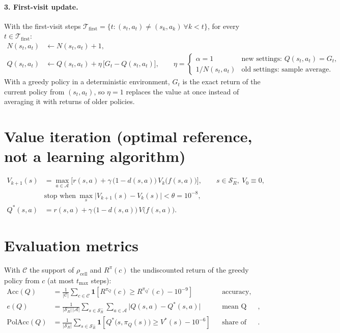 \documentclass[11pt]{article}
\newcommand{\Sset}{\mathcal{S}}
\newcommand{\Aset}{\mathcal{A}}
\newcommand{\ind}[1]{\mathbf{1}\!\left[#1\right]}
\newcommand{\Qs}{Q^{*}}
\begin{document}
\paragraph{3. First-visit update.} With the first-visit steps
$\mathcal{T}_{\mathrm{first}}=\{t:(s_t,a_t)\neq(s_k,a_k)\ \forall k<t\}$, for every $t\in\mathcal{T}_{\mathrm{first}}$:
\begin{align}
N(s_t,a_t) &\leftarrow N(s_t,a_t)+1,\\
Q(s_t,a_t) &\leftarrow Q(s_t,a_t)+\eta\,\big[G_t-Q(s_t,a_t)\big],\qquad
\eta=\begin{cases}\alpha=1 & \text{new settings: } Q(s_t,a_t)=G_t,\\ 1/N(s_t,a_t) & \text{old settings: sample average}.\end{cases}
\end{align}
With a greedy policy in a deterministic environment, $G_t$ is the exact return of the current policy from $(s_t,a_t)$, so $\eta=1$ replaces the value at once instead of averaging it with returns of older policies.

\section{Value iteration (optimal reference, not a learning algorithm)}
\begin{align}
V_{k+1}(s) &= \max_{a\in\Aset}\Big[r(s,a)+\gamma\,\big(1-d(s,a)\big)\,V_k\big(f(s,a)\big)\Big],\qquad s\in\Sset_R^{-},\ V_0\equiv0,\\
&\text{stop when}\ \max_{s}\big|V_{k+1}(s)-V_k(s)\big|<\theta=10^{-8},\\
\Qs(s,a) &= r(s,a)+\gamma\,\big(1-d(s,a)\big)\,V\big(f(s,a)\big).
\end{align}

\section{Evaluation metrics}
With $\mathcal{C}$ the support of $\rho_{\mathrm{cell}}$ and $R^{\pi}(c)$ the undiscounted return of the greedy policy from $c$ (at most $t_{\max}$ steps):
\begin{align}
\mathrm{Acc}(Q) &= \frac{1}{|\mathcal{C}|}\sum_{c\in\mathcal{C}}\ind{R^{\pi_Q}(c)\ge R^{\pi_{\Qs}}(c)-10^{-9}} && \text{accuracy},\\
e(Q) &= \frac{1}{|\Sset_R^{-}|\,|\Aset|}\sum_{s\in\Sset_R^{-}}\sum_{a\in\Aset}\big|Q(s,a)-\Qs(s,a)\big| && \text{mean Q error},\\
\mathrm{PolAcc}(Q) &= \frac{1}{|\Sset_R^{-}|}\sum_{s\in\Sset_R^{-}}\ind{\Qs\big(s,\pi_Q(s)\big)\ge V^{*}(s)-10^{-6}} && \text{share of states with an optimal greedy action}.
\end{align}
\end{document}
